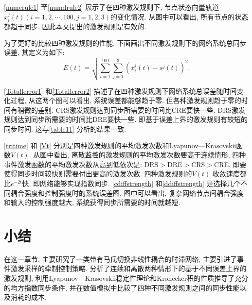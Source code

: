         \autoref{numcrule1} 至\autoref{numdrule2} 展示了在四种激发规则下, 节点状态向量轨道$x^j_i(t)(i=1,2,\cdots,100,j=1,2,3)$的变化情况. 从图中可以看出, 所有节点的状态都趋于同步. 因此本文提出的激发规则是有效的.

        为了更好的比较四种激发规则的性能, 下面画出不同激发规则下的网络系统总同步误差, 其定义为如下:
        $$E(t)=\sqrt{\sum_{i=1}^{100}\sum_{j=1}^3(x_i^j(t)-s^j(t))^2}. $$

        \autoref{Totallerror1} 和\autoref{Totallerror2} 描述了在四种激发规则下网络系统总误差随时间变化过程, 从这两个图可以看出, 系统误差都能够趋于零. 但各种激发规则趋于零的时间有稍微的差别. CRS激发规则达到同步所需要的时间比CRE要快一些. DRS激发规则达到同步所需要的时间比DRE要快一些. 即基于误差上界的激发规则有较短的同步时间. 这与\autoref{table11} 分析的结果一致.


        \autoref{tritime} 和 \autoref{Vt} 分别是四种激发规则的平均激发次数和Lyapunov—Krasovskii函数$V(t)$. 从图中看出, 离散监控的激发规则的平均激发次数要高于连续情形, 四种事件激发函数的平均激发次数从高到低依次是: DRS$>$DRE$>$CRS$>$CRE, 即要使得同步时间较快则需要付出更高的激发次数. 四种激发规则的$V(t)$ 收敛速度都比$e^{-2t}$快, 即网络能够实现指数同步. \autoref{cdiffstrength} 和\autoref{ddiffstrength} 是选择几个不同耦合强度和控制强度时的系统误差图, 图中可以看出, 复杂网络节点间耦合强度和输入的控制强度越大, 系统获得同步所需要的时间就越短.

\section{小结}
    在这一章节, 主要研究了一类带有马氏切换非线性耦合的时滞网络, 主要引进了事件激发采样的牵制控制策略. 分析了连续和离散两种情形下的基于不同误差上界的激发规则, 利用Lyapunov—Krasovskii稳定性理论和Kronecker积的性质推导了充分的均方指数同步条件, 并在数值模拟中比较了四种不同激发规则之间的同步性能以及消耗的成本.
